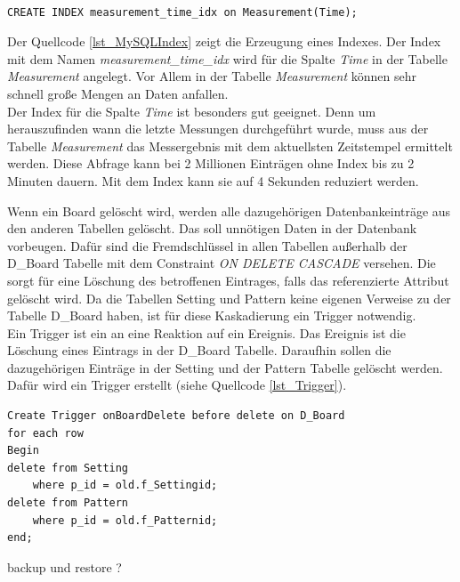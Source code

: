 \begin{lstlisting}[caption={MySQL Index},label=lst_MySQLIndex]

CREATE INDEX measurement_time_idx on Measurement(Time);

\end{lstlisting}


Der Quellcode \ref{lst_MySQLIndex} zeigt die Erzeugung eines Indexes. Der Index mit dem Namen \textit{measurement\_time\_idx} wird für die Spalte \textit{Time} in der Tabelle \textit{Measurement} angelegt. Vor Allem in der Tabelle \textit{Measurement} können sehr schnell große Mengen an Daten anfallen.\\
Der Index für die Spalte \textit{Time} ist besonders gut geeignet. Denn um herauszufinden wann die letzte Messungen durchgeführt wurde, muss aus der Tabelle \textit{Measurement} das Messergebnis mit dem aktuellsten Zeitstempel ermittelt werden. Diese Abfrage kann bei 2 Millionen Einträgen ohne Index bis zu  2 Minuten dauern. Mit dem Index kann sie auf 4 Sekunden reduziert werden.

Wenn ein Board gelöscht wird, werden alle dazugehörigen Datenbankeinträge aus den anderen Tabellen gelöscht. Das soll unnötigen Daten in der Datenbank vorbeugen. Dafür sind die Fremdschlüssel in allen Tabellen außerhalb der D\_Board Tabelle mit dem Constraint \textit{ON DELETE CASCADE} versehen. Die sorgt für eine Löschung des betroffenen Eintrages, falls das referenzierte Attribut gelöscht wird. Da die Tabellen Setting und Pattern keine eigenen Verweise zu der Tabelle D\_Board haben, ist für diese Kaskadierung ein Trigger notwendig. \\
Ein Trigger ist ein an eine Reaktion auf ein Ereignis. Das Ereignis ist die Löschung eines Eintrags in der D\_Board Tabelle. Daraufhin sollen die dazugehörigen Einträge in der Setting und der Pattern Tabelle gelöscht werden. Dafür wird ein Trigger erstellt (siehe Quellcode \ref{lst_Trigger}).\\

\begin{lstlisting}[caption={onBoardDelete Trigger},label=lst_Trigger]
Create Trigger onBoardDelete before delete on D_Board 
for each row 
Begin 
delete from Setting 
	where p_id = old.f_Settingid;
delete from Pattern 
	where p_id = old.f_Patternid;
end;
\end{lstlisting}








backup und restore ?

